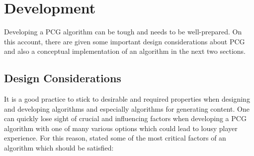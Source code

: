 \documentclass[MGS,Master,english]{twbook}%
\begin{document}
\section{Development} \label{pcgDevelopment}
Developing a PCG algorithm can be tough and needs to be well-prepared. On this account, there are given some important design considerations about PCG and also a conceptual implementation of an algorithm in the next two sections.

\subsection{Design Considerations}
It is a good practice to stick to desirable and required properties when designing and developing algorithms and especially algorithms for generating content. One can quickly lose sight of crucial and influencing factors when developing a PCG algorithm with one of many various options which could lead to lousy player experience. For this reason, \cite{pcg::book} stated some of the most critical factors of an algorithm which should be satisfied:
\end{document}
